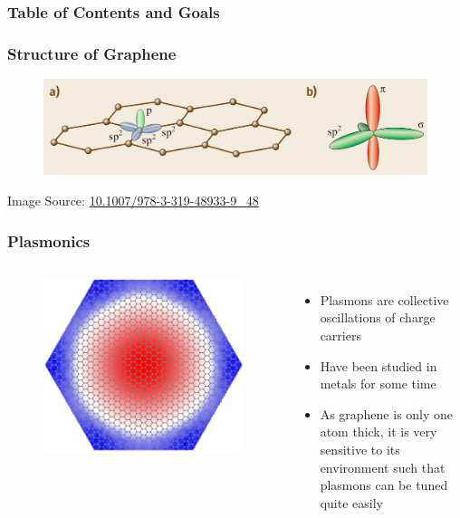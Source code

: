 \documentclass{beamer}
\begin{document}
\begin{frame}
    \frametitle{Table of Contents and Goals}
    \tableofcontents
\end{frame}

\begin{frame}
    \frametitle{Structure of Graphene}
    \begin{figure}[H]
        \centering
        \includegraphics[width=.9\linewidth]{img/graphene_structure.pdf}
    \end{figure}
    \tiny{Image Source: \href{https://link.springer.com/chapter/10.1007/978-3-319-48933-9_48}{10.1007/978-3-319-48933-9\_48}}
\end{frame}

\begin{frame}
    \frametitle{Plasmonics}
    \begin{columns}
    \begin{figure}
        \centering
        \includegraphics[width=\textwidth]{img/eigenmode.pdf}
    \end{figure}
    \begin{itemize}
        \item Plasmons are collective oscillations of charge carriers
        \item Have been studied in metals for some time
        \item As graphene is only one atom thick, it is very sensitive to its environment such that plasmons can be tuned quite easily
    \end{itemize}
    \end{columns}
\end{frame}
\end{document}
